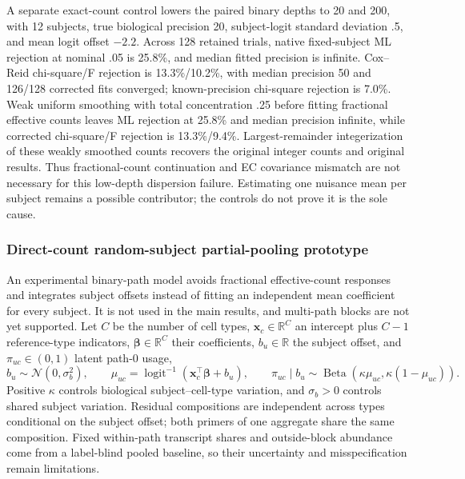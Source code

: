 \documentclass[11pt]{article}
\begin{document}
A separate exact-count control lowers the paired binary depths to 20 and 200, with 12 subjects, true biological precision 20, subject-logit standard deviation .5, and mean logit offset \(-2.2\). Across 128 retained trials, native fixed-subject ML rejection at nominal .05 is 25.8\%, and median fitted precision is infinite. Cox--Reid chi-square/F rejection is 13.3\%/10.2\%, with median precision 50 and 126/128 corrected fits converged; known-precision chi-square rejection is 7.0\%. Weak uniform smoothing with total concentration .25 before fitting fractional effective counts leaves ML rejection at 25.8\% and median precision infinite, while corrected chi-square/F rejection is 13.3\%/9.4\%. Largest-remainder integerization of these weakly smoothed counts recovers the original integer counts and original results. Thus fractional-count continuation and EC covariance mismatch are not necessary for this low-depth dispersion failure. Estimating one nuisance mean per subject remains a possible contributor; the controls do not prove it is the sole cause.

\subsubsection*{Direct-count random-subject partial-pooling prototype}

An experimental binary-path model avoids fractional effective-count responses and integrates subject offsets instead of fitting an independent mean coefficient for every subject. It is not used in the main results, and multi-path blocks are not yet supported. Let \(C\) be the number of cell types, \(\mathbf x_c\in\mathbb R^C\) an intercept plus \(C-1\) reference-type indicators, \(\boldsymbol\beta\in\mathbb R^C\) their coefficients, \(b_u\in\mathbb R\) the subject offset, and \(\pi_{uc}\in(0,1)\) latent path-0 usage, \begin{equation}b_u\sim\mathcal N(0,\sigma_b^2),\qquad \mu_{uc}=\operatorname{logit}^{-1}(\mathbf x_c^\top\boldsymbol\beta+b_u),\qquad \pi_{uc}\mid b_u\sim\operatorname{Beta}(\kappa\mu_{uc},\kappa(1-\mu_{uc})).\end{equation} Positive \(\kappa\) controls biological subject--cell-type variation, and \(\sigma_b>0\) controls shared subject variation. Residual compositions are independent across types conditional on the subject offset; both primers of one aggregate share the same composition. Fixed within-path transcript shares and outside-block abundance come from a label-blind pooled baseline, so their uncertainty and misspecification remain limitations.
\end{document}
